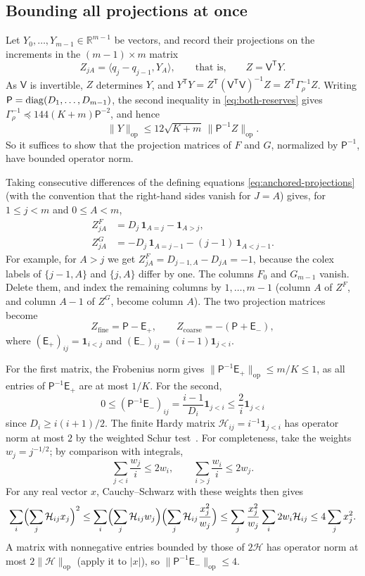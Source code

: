 \documentclass[11pt]{article}
\numberwithin{equation}{section}
\theoremstyle{definition}\newtheorem{definition}[theorem]{Definition}
\theoremstyle{remark}\newtheorem{remark}[theorem]{Remark}
\newcommand{\R}{\mathbb R}\newcommand{\N}{\mathbb N}
\newcommand{\ip}[2]{\langle #1,#2\rangle}
\newcommand{\opnorm}[1]{\lVert #1\rVert_{\mathrm{op}}}
\newcommand{\T}{\mathsf T}\newcommand{\one}{\mathbf1}
\begin{document}
\subsection{Bounding all projections at once}\label{sec:app-projections}

Let $Y_0,\dots,Y_{m-1}\in\R^{m-1}$ be vectors, and record their
projections on the increments in the $(m-1)\times m$ matrix
\[
 Z_{jA}=\ip{q_j-q_{j-1}}{Y_A},\qquad\text{that is,}\qquad Z=\mathsf V^\T Y.
\]
As $\mathsf V$ is invertible, $Z$ determines $Y$, and
$Y^\T Y=Z^\T(\mathsf V^\T\mathsf V)^{-1}Z=Z^\T\Gamma_\rho^{-1}Z$. Writing
$\mathsf P=\operatorname{diag}(D_1,\dots,D_{m-1})$, the second inequality in
\eqref{eq:both-reserves} gives
$\Gamma_\rho^{-1}\preceq144(K+m)\mathsf P^{-2}$, and hence
\begin{equation}\label{eq:whole-solve}
 \opnorm Y\le12\sqrt{K+m}\,\opnorm{\mathsf P^{-1}Z}.
\end{equation}
So it suffices to show that the projection matrices of $F$ and $G$,
normalized by $\mathsf P^{-1}$, have bounded operator norm.

Taking consecutive differences of the defining equations
\eqref{eq:anchored-projections} (with the convention that the right-hand
sides vanish for $J=A$) gives, for $1\le j<m$ and $0\le A<m$,
\begin{align*}
 Z^F_{jA}&=D_j\,\one_{A=j}-\one_{A>j},\\
 Z^G_{jA}&=-D_j\,\one_{A=j-1}-(j-1)\,\one_{A<j-1}.
\end{align*}
For example, for $A>j$ we get $Z^F_{jA}=D_{j-1,A}-D_{jA}=-1$, because the
colex labels of $\{j-1,A\}$ and $\{j,A\}$ differ by one. The columns $F_0$
and $G_{m-1}$ vanish. Delete them, and index the remaining columns by
$1,\dots,m-1$ (column $A$ of $Z^F$, and column $A-1$ of $Z^G$, become
column $A$). The two projection matrices become
\[
 Z_{\mathrm{fine}}=\mathsf P-\mathsf E_+,\qquad
 Z_{\mathrm{coarse}}=-(\mathsf P+\mathsf E_-),
\]
where $(\mathsf E_+)_{ij}=\one_{i<j}$ and
$(\mathsf E_-)_{ij}=(i-1)\one_{j<i}$.

For the first matrix, the Frobenius norm gives
$\opnorm{\mathsf P^{-1}\mathsf E_+}\le m/K\le1$, as all entries of
$\mathsf P^{-1}\mathsf E_+$ are at most $1/K$. For the second,
\[
 0\le(\mathsf P^{-1}\mathsf E_-)_{ij}
 =\frac{i-1}{D_i}\one_{j<i}
 \le\frac2i\one_{j<i}
\]
since $D_i\ge i(i+1)/2$. The finite Hardy matrix
$\mathcal H_{ij}=i^{-1}\one_{j<i}$ has operator norm at most $2$ by the
weighted Schur test~\cite{Schur,Sinnamon}. For completeness, take
the weights $w_j=j^{-1/2}$; by comparison with integrals,
\[
 \sum_{j<i}\frac{w_j}{i}\le2w_i,
 \qquad \sum_{i>j}\frac{w_i}{i}\le2w_j.
\]
For any real vector $x$, Cauchy--Schwarz with these weights then gives
\[
 \sum_i\Bigl(\sum_j \mathcal H_{ij}x_j\Bigr)^2
 \le\sum_i\Bigl(\sum_j\mathcal H_{ij}w_j\Bigr)
          \Bigl(\sum_j\mathcal H_{ij}\frac{x_j^2}{w_j}\Bigr)
 \le\sum_j\frac{x_j^2}{w_j}\sum_i2w_i\mathcal H_{ij}
 \le4\sum_jx_j^2.
\]
A matrix with nonnegative entries bounded by those of $2\mathcal H$ has
operator norm at most $2\opnorm{\mathcal H}$ (apply it to $|x|$), so
$\opnorm{\mathsf P^{-1}\mathsf E_-}\le4$.
\end{document}

